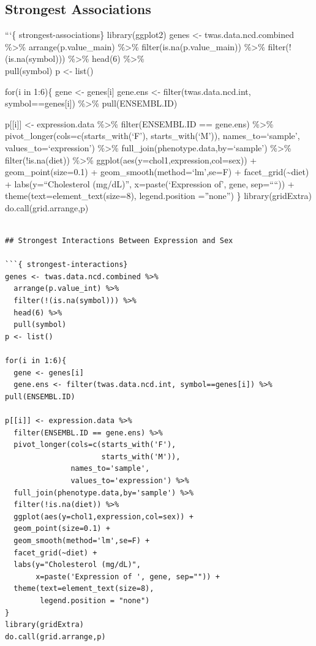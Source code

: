 \documentclass[
]{article}
\begin{document}
\hypertarget{strongest-associations}{%
\subsection{Strongest Associations}\label{strongest-associations}}

```\{ strongest-associations\} library(ggplot2) genes \textless-
twas.data.ncd.combined \%\textgreater\% arrange(p.value\_main)
\%\textgreater\% filter(is.na(p.value\_main)) \%\textgreater\%
filter(!(is.na(symbol))) \%\textgreater\% head(6) \%\textgreater\%\\
pull(symbol) p \textless- list()

for(i in 1:6)\{ gene \textless- genes{[}i{]} gene.ens \textless-
filter(twas.data.ncd.int, symbol==genes{[}i{]}) \%\textgreater\%
pull(ENSEMBL.ID)

p{[}{[}i{]}{]} \textless- expression.data \%\textgreater\%
filter(ENSEMBL.ID == gene.ens) \%\textgreater\%
pivot\_longer(cols=c(starts\_with(`F'), starts\_with(`M')),
names\_to=`sample', values\_to=`expression') \%\textgreater\%
full\_join(phenotype.data,by=`sample') \%\textgreater\%
filter(!is.na(diet)) \%\textgreater\%
ggplot(aes(y=chol1,expression,col=sex)) + geom\_point(size=0.1) +
geom\_smooth(method=`lm',se=F) + facet\_grid(\textasciitilde diet) +
labs(y=``Cholesterol (mg/dL)'', x=paste(`Expression of', gene,
sep=````)) + theme(text=element\_text(size=8), legend.position
=''none'') \} library(gridExtra) do.call(grid.arrange,p)

\begin{verbatim}

## Strongest Interactions Between Expression and Sex

```{ strongest-interactions}
genes <- twas.data.ncd.combined %>% 
  arrange(p.value_int) %>%
  filter(!(is.na(symbol))) %>% 
  head(6) %>%  
  pull(symbol)
p <- list()

for(i in 1:6){
  gene <- genes[i] 
  gene.ens <- filter(twas.data.ncd.int, symbol==genes[i]) %>% pull(ENSEMBL.ID)

p[[i]] <- expression.data %>%
  filter(ENSEMBL.ID == gene.ens) %>%
  pivot_longer(cols=c(starts_with('F'),
                      starts_with('M')),
               names_to='sample',
               values_to='expression') %>%
  full_join(phenotype.data,by='sample') %>%
  filter(!is.na(diet)) %>%
  ggplot(aes(y=chol1,expression,col=sex)) +
  geom_point(size=0.1) +
  geom_smooth(method='lm',se=F) +
  facet_grid(~diet) +
  labs(y="Cholesterol (mg/dL)",
       x=paste('Expression of ', gene, sep="")) +
  theme(text=element_text(size=8),
        legend.position = "none")
}
library(gridExtra)
do.call(grid.arrange,p)
\end{verbatim}
\end{document}
